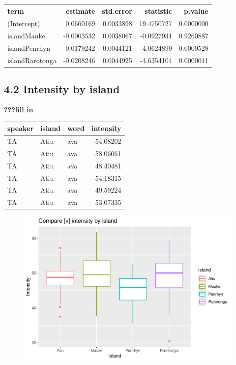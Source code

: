 \documentclass[
  ,man,floatsintext]{apa6}
\begin{document}
\begin{tabular}{l|r|r|r|r}
\hline
term & estimate & std.error & statistic & p.value\\
\hline
(Intercept) & 0.0660169 & 0.0033898 & 19.4750727 & 0.0000000\\
\hline
islandMauke & -0.0003532 & 0.0038067 & -0.0927931 & 0.9260887\\
\hline
islandPenrhyn & 0.0179242 & 0.0044121 & 4.0624899 & 0.0000528\\
\hline
islandRarotonga & -0.0208246 & 0.0044925 & -4.6354104 & 0.0000041\\
\hline
\end{tabular}

\subsection{4.2 Intensity by island}\label{intensity-by-island}

\textbf{???fill in}

\begin{tabular}{l|l|l|r}
\hline
speaker & island & word & intensity\\
\hline
TA & Atiu & ava & 54.08202\\
\hline
TA & Atiu & ava & 58.06061\\
\hline
TA & Atiu & ava & 48.40481\\
\hline
TA & Atiu & ava & 54.18315\\
\hline
TA & Atiu & ava & 49.59224\\
\hline
TA & Atiu & ava & 53.07335\\
\hline
\end{tabular}

\begin{figure}
\includegraphics[width=0.75\linewidth]{D2_CIM_files/figure-latex/print-intensity-plot-1} \caption{ }\label{fig:print-intensity-plot}
\end{figure}
\end{document}
